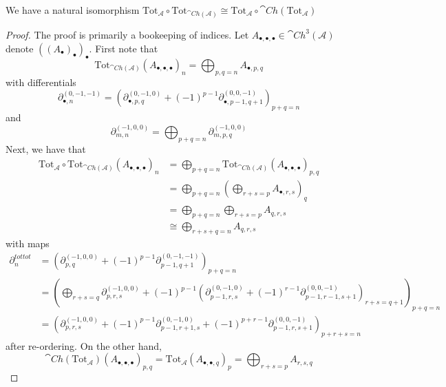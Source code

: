 \begin{lem}[label=lem:TotAssoc]
	We have a natural isomorphism $\text{Tot}_\mathcal{A}\circ \text{Tot}_{\cat{Ch}(\mathcal{A})}\cong \text{Tot}_\mathcal{A}\circ \cat{Ch}(\text{Tot}_\mathcal{A})$
\end{lem}
\begin{proof}
	The proof is primarily a bookeeping of indices. Let $A_{\bullet,\bullet,\bullet} \in \cat{Ch}^3(\mathcal{A})$ denote $((A_\bullet)_\bullet)_\bullet$. First note that 
	\begin{equation*}
		\text{Tot}_{\cat{Ch}(\mathcal{A})}(A_{\bullet,\bullet,\bullet})_n = \bigoplus_{p,q=n}A_{\bullet,p,q}
	\end{equation*}
	with differentials
	\begin{equation*}
		\partial^{(0,-1,-1)}_{\bullet,n} = (\partial_{\bullet,p,q}^{(0,-1,0)}+(-1)^{p-1}\partial_{\bullet,p-1,q+1}^{(0,0,-1)})_{p+q=n}
	\end{equation*}
	and 
	\begin{equation*}
		\partial^{(-1,0,0)}_{m,n} = \bigoplus_{p+q=n}\partial_{m,p,q}^{(-1,0,0)}
	\end{equation*}
	Next, we have that 
	\begin{align*}
		\text{Tot}_\mathcal{A}\circ \text{Tot}_{\cat{Ch}(\mathcal{A})}(A_{\bullet,\bullet,\bullet})_n &= \bigoplus_{p+q=n}\text{Tot}_{\cat{Ch}(\mathcal{A})}(A_{\bullet,\bullet,\bullet})_{p,q} \\
		&= \bigoplus_{p+q=n}\left(\bigoplus_{r+s=p}A_{\bullet,r,s}\right)_q \\
		&= \bigoplus_{p+q=n}\bigoplus_{r+s=p}A_{q,r,s} \\
		&\cong \bigoplus_{r+s+q=n}A_{q,r,s}
	\end{align*}
	with maps 
	\begin{align*}
		\partial^{tottot}_n &= (\partial_{p,q}^{(-1,0,0)}+(-1)^{p-1}\partial^{(0,-1,-1)}_{p-1,q+1})_{p+q=n} \\
		&= \left(\bigoplus_{r+s=q}\partial_{p,r,s}^{(-1,0,0)}+(-1)^{p-1}(\partial_{p-1,r,s}^{(0,-1,0)}+(-1)^{r-1}\partial_{p-1,r-1,s+1}^{(0,0,-1)})_{r+s=q+1}\right)_{p+q=n} \\
		&= \left(\partial_{p,r,s}^{(-1,0,0)}+(-1)^{p-1}\partial_{p-1,r+1,s}^{(0,-1,0)}+(-1)^{p+r-1}\partial_{p-1,r,s+1}^{(0,0,-1)}\right)_{p+r+s=n}
	\end{align*}
	after re-ordering. On the other hand,
	\begin{equation*}
		\cat{Ch}(\text{Tot}_\mathcal{A})(A_{\bullet,\bullet,\bullet})_{p,q} = \text{Tot}_\mathcal{A}(A_{\bullet,\bullet,q})_p = \bigoplus_{r+s=p}A_{r,s,q}

\end{equation*}
\end{proof}
